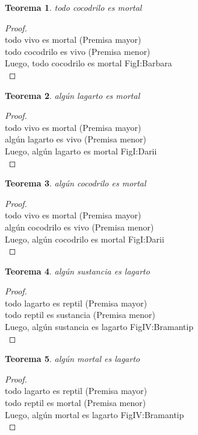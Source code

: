 ﻿\documentclass[12pt]{book}
\newtheorem{theorem}{Teorema}[chapter]
\newtheorem{proof}{Demostración}
\begin{document}
\begin{theorem}
todo cocodrilo es mortal
\label{th: 117}
\end{theorem}\begin{proof}\\todo vivo es mortal	 (Premisa mayor) \\todo cocodrilo es vivo	 (Premisa menor) \\Luego, todo cocodrilo es mortal	FigI:Barbara \\ \end{proof}
\begin{theorem}
algún lagarto es mortal
\label{th: 118}
\end{theorem}\begin{proof}\\todo vivo es mortal	 (Premisa mayor) \\algún lagarto es vivo	 (Premisa menor) \\Luego, algún lagarto es mortal	FigI:Darii \\ \end{proof}
\begin{theorem}
algún cocodrilo es mortal
\label{th: 119}
\end{theorem}\begin{proof}\\todo vivo es mortal	 (Premisa mayor) \\algún cocodrilo es vivo	 (Premisa menor) \\Luego, algún cocodrilo es mortal	FigI:Darii \\ \end{proof}
\begin{theorem}
algún sustancia es lagarto
\label{th: 120}
\end{theorem}\begin{proof}\\todo lagarto es reptil	 (Premisa mayor) \\todo reptil es sustancia	 (Premisa menor) \\Luego, algún sustancia es lagarto	FigIV:Bramantip \\ \end{proof}
\begin{theorem}
algún mortal es lagarto
\label{th: 121}
\end{theorem}\begin{proof}\\todo lagarto es reptil	 (Premisa mayor) \\todo reptil es mortal	 (Premisa menor) \\Luego, algún mortal es lagarto	FigIV:Bramantip \\ \end{proof}
\end{document}
